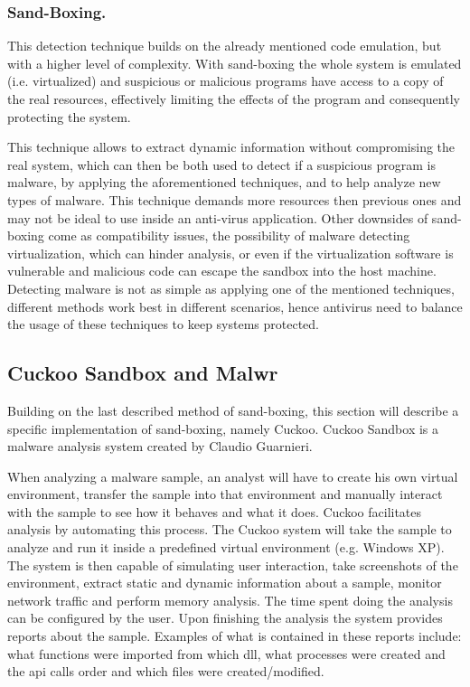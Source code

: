 \documentclass{llncs}
\begin{document}
\subsubsection{Sand-Boxing.} This detection technique builds on the already mentioned code emulation, but with a higher level of complexity. With sand-boxing the whole system is emulated (i.e. virtualized) and suspicious or malicious programs have access to a copy of the real resources, effectively limiting the effects of the program and consequently protecting the system.

This technique allows to extract dynamic information without compromising the real system, which can then be both used to detect if a suspicious program is malware, by applying the aforementioned techniques, and to help analyze new types of malware. This technique demands more resources then previous ones and may not be ideal to use inside an anti-virus application. Other downsides of sand-boxing come as compatibility issues, the possibility of malware detecting virtualization, which can hinder analysis, or even if the virtualization software is vulnerable and malicious code can escape the sandbox into the host machine.\\

Detecting malware is not as simple as applying one of the mentioned techniques, different methods work best in different scenarios, hence antivirus need to balance the usage of these techniques to keep systems protected.

\subsection{Cuckoo Sandbox and Malwr}\label{subsec:cuckoo}

Building on the last described method of sand-boxing, this section will describe a specific implementation of sand-boxing, namely Cuckoo. Cuckoo Sandbox is a malware analysis system created by Claudio Guarnieri\cite{tool:cuckoo}.

When analyzing a malware sample, an analyst will have to create his own virtual environment, transfer the sample into that environment and manually interact with the sample to see how it behaves and what it does. Cuckoo facilitates analysis by automating this process. The Cuckoo system will take the sample to analyze and run it inside a predefined virtual environment (e.g. Windows XP). The system is then capable of simulating user interaction, take screenshots of the environment, extract static and dynamic information about a sample, monitor network traffic and perform memory analysis. The time spent doing the analysis can be configured by the user. Upon finishing the analysis the system provides reports about the sample. Examples of what is contained in these reports include: what functions were imported from which \gls{dll}, what processes were created and the \gls{api} calls order and which files were created/modified.
\end{document}
